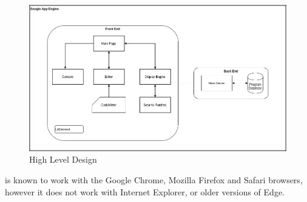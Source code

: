 \begin{figure}
    \caption{\trys{} High Level Design}
    \label{trysetantadiagram}
    \begin{center}
    \includegraphics[scale=0.4]{trysetantadiagram}
    \end{center}
\end{figure}

\trys{} is known to work with the Google Chrome, Mozilla Firefox and Safari browsers, however it does not work with Internet Explorer, or older versions of Edge.
